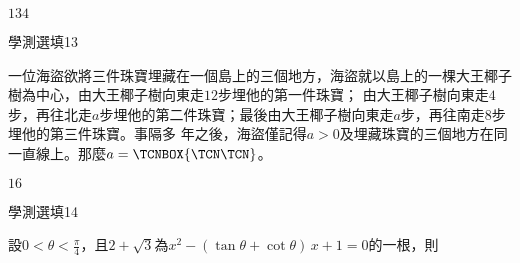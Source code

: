 \begin{QUESTIONS}
\begin{QUESTION}
        \begin{QTAGS}\end{QTAGS}
        \begin{QANS}
            $134$
        \end{QANS}
        \begin{QSOLLIST}
        \end{QSOLLIST}
        \begin{QEMPTYSPACE}
        \end{QEMPTYSPACE}
    \end{QUESTION}
    \begin{QUESTION}
        \begin{ExamInfo}{88}{學測}{選填}{13}
        \end{ExamInfo}
        \begin{ExamAnsRateInfo}{}{}{}{}
        \end{ExamAnsRateInfo}
        \begin{QBODY}
            一位海盜欲將三件珠寶埋藏在一個島上的三個地方，海盜就以島上的一棵大王椰子樹為中心，由大王椰子樹向東走$12$步埋他的第一件珠寶；
            由大王椰子樹向東走$4$步，再往北走$a$步埋他的第二件珠寶；最後由大王椰子樹向東走$a$步，再往南走$8$步埋他的第三件珠寶。事隔多
            年之後，海盜僅記得$a>0$及埋藏珠寶的三個地方在同一直線上。那麼$a =\TCNBOX{\TCN\TCN}$。
        \end{QBODY}
        \begin{QFROMS}
        \end{QFROMS}
        \begin{QTAGS}\end{QTAGS}
        \begin{QANS}
            $16$
        \end{QANS}
        \begin{QSOLLIST}
        \end{QSOLLIST}
        \begin{QEMPTYSPACE}
        \end{QEMPTYSPACE}
    \end{QUESTION}
    \begin{QUESTION}
        \begin{ExamInfo}{88}{學測}{選填}{14}
        \end{ExamInfo}
        \begin{ExamAnsRateInfo}{}{}{}{}
        \end{ExamAnsRateInfo}
        \begin{QBODY}
            設$0<\theta  < \frac{\pi }{4}$，且$2+\sqrt{3}$為${{x}^{2}}-(\tan \theta +\cot \theta )\,x+1=0$的一根，則

\end{QBODY}
\end{QUESTION}
\end{QUESTIONS}
